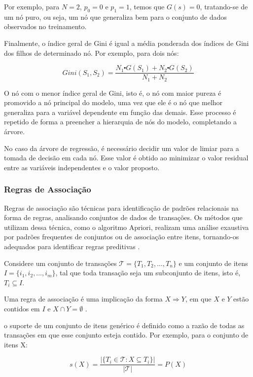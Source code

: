 Por exemplo, para $N = 2$, $p_{0} = 0$ e $p_{1} = 1$, temos que $G(s) = 0$,
tratando-se de um nó puro, ou seja, um nó que generaliza bem para o conjunto de
dados observados no treinamento.

Finalmente, o índice geral de Gini é igual a média ponderada dos índices de Gini
dos filhos de determinado nó. Por exemplo, para dois nós:


\begin{equation}
    Gini(S_1, S_2) = \frac{N_1 \centerdot G(S_1) +  N_2 \centerdot G(S_2)}{N_1 + N_2}
\end{equation}

O nó com o menor índice geral de Gini, isto é, o nó com maior pureza é promovido
a nó principal do modelo, uma vez que ele é o nó que melhor generaliza para a
variável dependente em função das demais. Esse processo é repetido de forma a
preencher a hierarquia de nós do modelo, completando a árvore.

No caso da árvore de regressão, é necessário decidir um valor de limiar para a
tomada de decisão em cada nó. Esse valor é obtido ao minimizar o valor residual
entre as variáveis independentes e o valor proposto.

\subsubsection{Regras de Associação}
Regras de associação são técnicas para identificação de padrões relacionais
na forma de regras, analisando conjuntos de dados de transações. Os métodos que
utilizam dessa técnica, como o algoritmo Apriori, realizam uma análise exaustiva
por padrões frequentes de conjuntos ou de associação entre itens, tornando-os
adequados para identificar regras preditivas \cite{jannach2011recommender}.

Considere um conjunto de transações $\mathcal{T} = \{T_1, T_2, \dots, T_n\}$ e
um conjunto de itens $I = \{i_1, i_2, \dots, i_m\}$, tal que toda transação seja
um subconjunto de itens, isto é, $T_i \subseteq I$.

Uma regra de associação é uma
implicação da forma $X \Rightarrow Y$, em que $X$ e $Y$ estão contidos em $I$ e
$X \cap Y = \emptyset$ \cite{ordonez2011evaluating}.

o suporte de um conjunto de itens genérico é definido como a razão de todas as
transações em que esse conjunto esteja contido. Por exemplo, para o conjunto de
itens X:

\begin{equation}
s(X) = \frac{|\{T_i \in \mathcal{T} : X \subseteq T_i\}|}{|\mathcal{T}|} = P(X)
\end{equation}

